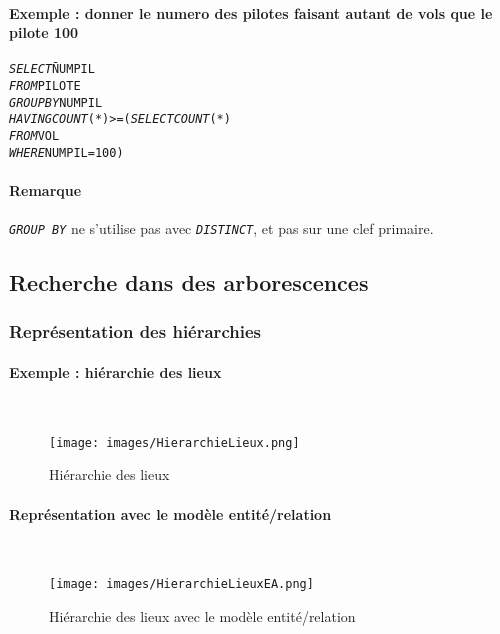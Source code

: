 \documentclass[10pt]{article}
\begin{document}
			\paragraph{Exemple : donner le numero des pilotes faisant autant de vols que le pilote 100}
				\begin{alltt}
					\begin{tabbing}
						\emph{SELECT} \= NUMPIL\\
						\emph{FROM} \> PILOTE\\
						\emph{GROUP BY} \> NUMPIL\\
						\emph{HAVING} \> \emph{COUNT}(*)>=(\=\emph{SELECT} \= \emph{COUNT}(*)\\
															\>\>\emph{FROM} \> VOL\\
															\>\>\emph{WHERE} \> NUMPIL=100)
					\end{tabbing}
				\end{alltt}
				
			\paragraph{Remarque} \emph{\texttt{GROUP BY}} ne s'utilise pas avec \emph{\texttt{DISTINCT}}, et pas sur une clef primaire.
			
		\subsection{Recherche dans des arborescences}
			\subsubsection{Représentation des hiérarchies}
				\paragraph{Exemple : hiérarchie des lieux}
					~\\
					\begin{figure}[H]
						\begin{center}
							\texttt{[image: images/HierarchieLieux.png]}
						\end{center}
						\caption{Hiérarchie des lieux}
					\end{figure}

				\paragraph{Représentation avec le modèle entité/relation}
				~\\
					\begin{figure}[H]
						\begin{center}
							\texttt{[image: images/HierarchieLieuxEA.png]}
						\end{center}
						\caption{Hiérarchie des lieux avec le modèle entité/relation}
					\end{figure}
					
\end{document}
